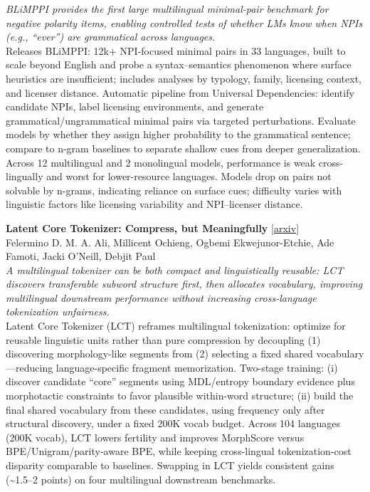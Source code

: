 \documentclass[12pt,letterpaper]{article}
\begin{document}
{\small\textit{BLiMPPI provides the first large multilingual minimal-pair benchmark for negative polarity items, enabling controlled tests of whether LMs know when NPIs (e.g., ``ever'') are grammatical across languages.}}\\[1pt]
{\footnotesize Releases BLiMPPI: 12k+ NPI-focused minimal pairs in 33 languages, built to scale beyond English and probe a syntax--semantics phenomenon where surface heuristics are insufficient; includes analyses by typology, family, licensing context, and licenser distance. Automatic pipeline from Universal Dependencies: identify candidate NPIs, label licensing environments, and generate grammatical/ungrammatical minimal pairs via targeted perturbations. Evaluate models by whether they assign higher probability to the grammatical sentence; compare to n-gram baselines to separate shallow cues from deeper generalization. Across 12 multilingual and 2 monolingual models, performance is weak cross-lingually and worst for lower-resource languages. Models drop on pairs not solvable by n-grams, indicating reliance on surface cues; difficulty varies with linguistic factors like licensing variability and NPI--licenser distance.}

\medskip

{\small\textbf{Latent Core Tokenizer: Compress, but Meaningfully}} {\scriptsize[\href{https://arxiv.org/abs/2610.12376}{arxiv}]}\\
{\scriptsize Felermino D. M. A. Ali, Millicent Ochieng, Ogbemi Ekwejunor-Etchie, Ade Famoti, Jacki O'Neill, Debjit Paul}\\

{\small\textit{A multilingual tokenizer can be both compact and linguistically reusable: LCT discovers transferable subword structure first, then allocates vocabulary, improving multilingual downstream performance without increasing cross-language tokenization unfairness.}}\\[1pt]
{\footnotesize Latent Core Tokenizer (LCT) reframes multilingual tokenization: optimize for reusable linguistic units rather than pure compression by decoupling (1) discovering morphology-like segments from (2) selecting a fixed shared vocabulary---reducing language-specific fragment memorization. Two-stage training: (i) discover candidate ``core'' segments using MDL/entropy boundary evidence plus morphotactic constraints to favor plausible within-word structure; (ii) build the final shared vocabulary from these candidates, using frequency only after structural discovery, under a fixed 200K vocab budget. Across 104 languages (200K vocab), LCT lowers fertility and improves MorphScore versus BPE/Unigram/parity-aware BPE, while keeping cross-lingual tokenization-cost disparity comparable to baselines. Swapping in LCT yields consistent gains (\textasciitilde{}1.5--2 points) on four multilingual downstream benchmarks.}
\end{document}
